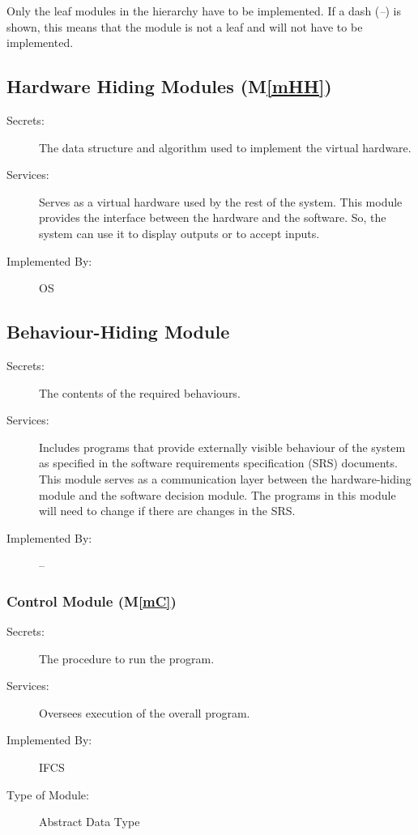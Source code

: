 \documentclass[12pt, titlepage]{article}
\newcommand{\mref}[1]{M\ref{#1}}
\begin{document}
Only the leaf modules in the hierarchy have to be implemented. If a dash
(\emph{--}) is shown, this means that the module is not a leaf and will not have
to be implemented.

\subsection{Hardware Hiding Modules (\mref{mHH})}

\begin{description}
\item[Secrets:]The data structure and algorithm used to implement the virtual
  hardware.
\item[Services:]Serves as a virtual hardware used by the rest of the
  system. This module provides the interface between the hardware and the
  software. So, the system can use it to display outputs or to accept inputs.
\item[Implemented By:] OS
\end{description}

\subsection{Behaviour-Hiding Module}

\begin{description}
\item[Secrets:]The contents of the required behaviours.
\item[Services:]Includes programs that provide externally visible behaviour of
  the system as specified in the software requirements specification (SRS)
  documents. This module serves as a communication layer between the
  hardware-hiding module and the software decision module. The programs in this
  module will need to change if there are changes in the SRS.
\item[Implemented By:] --
\end{description}

\subsubsection{Control Module (\mref{mC})}

\begin{description}
\item[Secrets:]The procedure to run the program.
\item[Services:]Oversees execution of the overall program.
\item[Implemented By:] IFCS
\item[Type of Module:] Abstract Data Type
\end{description}
\end{document}
